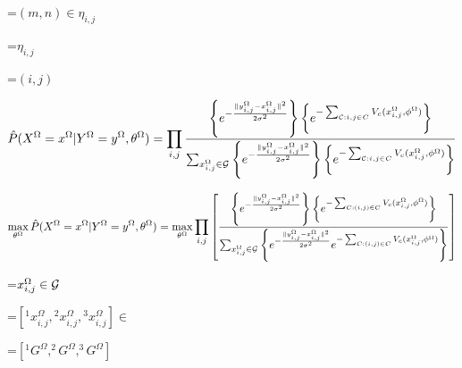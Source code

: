 {\newpage
\clearpage
\samepage \setbox\sizebox=\hbox{$(m,n) \in \eta_{i,j}$}\box\sizebox
}

{\newpage
\clearpage
\samepage \setbox\sizebox=\hbox{$\eta_{i,j}$}\box\sizebox
}

{\newpage
\clearpage
\samepage \setbox\sizebox=\hbox{$(i,j)$}\box\sizebox
}

{\newpage
\clearpage
\samepage \begin{displaymath}%
\hat P(X^\Omega=x^\Omega|Y^\Omega=y^\Omega, \theta^\Omega) = 
\prod_{i,j} \frac{
\left \{ e^{- \frac{\| y_{i,j}^\Omega - x_{i,j}^\Omega\|^2}{2 \sigma^2}} \right \}
\left \{ e^{- \sum_{{\cal C}:i,j\in C}
V_{c}(x^\Omega_{i,j},\phi^\Omega)} \right \} }{\sum_{x^\Omega_{i,j}\in {\cal G}}
\left \{ e^{- \frac{\|y_{i,j}^\Omega - x_{i,j}^\Omega\|^2}{2 \sigma^2}} \right \}
\left \{ e^ {- \sum_{{\cal C}:i,j\in C} V_{c}(x^\Omega_{i,j},\phi^\Omega)} \right \}}
\end{displaymath}
}

{\newpage
\clearpage
\samepage \begin{equation}%
\max_{\theta^\Omega} \hat{P}(X^\Omega=x^\Omega | Y^\Omega=y^\Omega, \theta^\Omega) =
\max_{\theta^\Omega} \prod_{i,j} 
\left[
 \frac{
\left \{ e^{- \frac{\|y_{i,j}^\Omega - x_{i,j}^\Omega\|^2}{2 \sigma^2}} \right \}
\left \{ e^{- \sum_{C:(i,j) \in C} V_{c}(x^\Omega_{i,j}, \phi^\Omega)} \right \}}
{\sum_{{x^\Omega_{i,j}}\in {\cal G}} \left\{
e^{- \frac{\|y_{i,j}^\Omega - x_{i,j}^\Omega\|^2}{2 \sigma^2}} 
e^{- \sum_{C:(i,j) \in C}
V_{c}(x^\Omega_{i,j}, \phi^\Omega)} \right\} } \right]
\label{eq:pseudo_likelihood}
\end{equation}
}

{\newpage
\clearpage
\samepage \setbox\sizebox=\hbox{$x^\Omega_{i,j} \in {\cal G}$}\box\sizebox
}

{\newpage
\clearpage
\samepage \setbox\sizebox=\hbox{$[ {^1x^\Omega_{i,j}}, {^2x^\Omega_{i,j}}, {^3x^\Omega_{i,j}} ] \in$}\box\sizebox
}

{\newpage
\clearpage
\samepage \setbox\sizebox=\hbox{$[^1 G^\Omega, ^2 G^\Omega, ^3 G^\Omega]$}\box\sizebox
}

